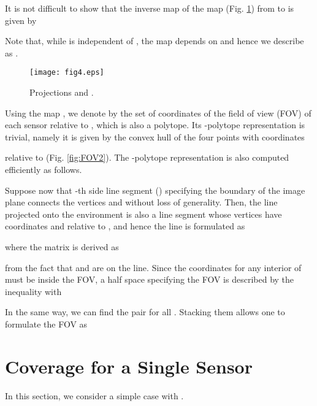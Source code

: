 \documentclass[conference,letterpaper]{ieeeconf}
\begin{document}
It is not difficult to show that the inverse map  
of the map  (Fig. \ref{fig:proj1}) from 
to  is given by

Note that, while  is independent of ,
the map  depends on  and hence we describe  as 
.



\begin{figure}[t]
\begin{center}
\texttt{[image: fig4.eps]}
\caption{Projections  and .}
\label{fig:proj1}
\end{center}
\end{figure}



Using the map , we denote by  the set of coordinates
of the field of view (FOV) of each sensor  relative to , which is also a polytope.
Its -polytope representation is trivial, namely it is given by
the convex hull of the four points with coordinates

relative to 
(Fig. \ref{fig:FOV2}).
The -polytope representation is also 
computed efficiently as follows.



Suppose now that -th side line segment () specifying 
the boundary of the image plane connects the vertices  and 
without loss of generality.
Then, the line projected onto the environment is also a 
line segment whose vertices have coordinates 
 and 
relative to , and hence the line is formulated as

where the matrix  is derived as

from the fact that  and 
are on the line.
Since the coordinates 
for any interior  of  must be inside the FOV,
a half space specifying the FOV is described by the inequality
 with

In the same way, we can find the pair  for all .
Stacking them allows one to formulate the FOV as











\section{Coverage for a Single Sensor}


In this section, we consider a simple case with 
.
\end{document}
